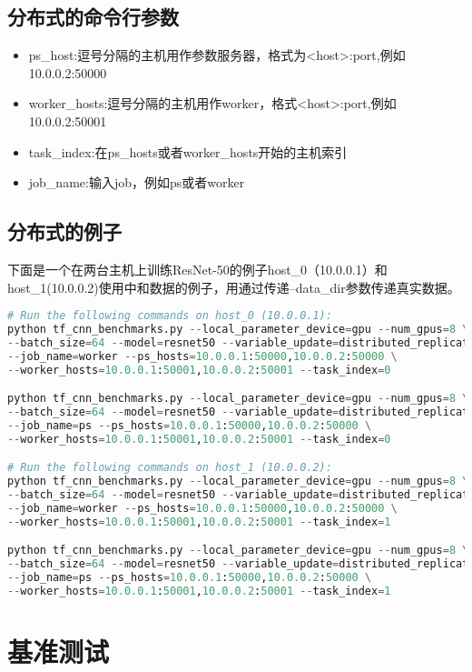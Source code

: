 \subsection{分布式的命令行参数}
\begin{itemize}
	\item ps\_host:逗号分隔的主机用作参数服务器，格式为<host>:port,例如10.0.0.2:50000
	\item worker\_hosts:逗号分隔的主机用作worker，格式<host>:port,例如10.0.0.2:50001
	\item task\_index:在ps\_hosts或者worker\_hosts开始的主机索引
	\item job\_name:输入job，例如ps或者worker 
\end{itemize}
\subsection{分布式的例子}
下面是一个在两台主机上训练ResNet-50的例子host\_0（10.0.0.1）和host\_1(10.0.0.2)使用中和数据的例子，用通过传递--data\_dir参数传递真实数据。
\begin{lstlisting}[language=Python]
# Run the following commands on host_0 (10.0.0.1):
python tf_cnn_benchmarks.py --local_parameter_device=gpu --num_gpus=8 \
--batch_size=64 --model=resnet50 --variable_update=distributed_replicated \
--job_name=worker --ps_hosts=10.0.0.1:50000,10.0.0.2:50000 \
--worker_hosts=10.0.0.1:50001,10.0.0.2:50001 --task_index=0

python tf_cnn_benchmarks.py --local_parameter_device=gpu --num_gpus=8 \
--batch_size=64 --model=resnet50 --variable_update=distributed_replicated \
--job_name=ps --ps_hosts=10.0.0.1:50000,10.0.0.2:50000 \
--worker_hosts=10.0.0.1:50001,10.0.0.2:50001 --task_index=0

# Run the following commands on host_1 (10.0.0.2):
python tf_cnn_benchmarks.py --local_parameter_device=gpu --num_gpus=8 \
--batch_size=64 --model=resnet50 --variable_update=distributed_replicated \
--job_name=worker --ps_hosts=10.0.0.1:50000,10.0.0.2:50000 \
--worker_hosts=10.0.0.1:50001,10.0.0.2:50001 --task_index=1

python tf_cnn_benchmarks.py --local_parameter_device=gpu --num_gpus=8 \
--batch_size=64 --model=resnet50 --variable_update=distributed_replicated \
--job_name=ps --ps_hosts=10.0.0.1:50000,10.0.0.2:50000 \
--worker_hosts=10.0.0.1:50001,10.0.0.2:50001 --task_index=1
\end{lstlisting}
\section{基准测试}
